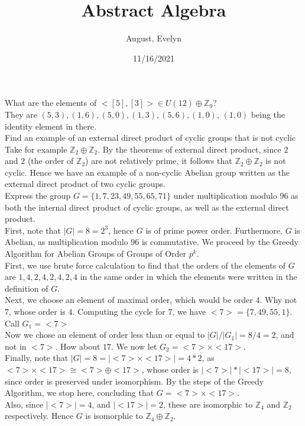 \documentclass{article}
\title{Abstract Algebra}
\author{August, Evelyn}
\date{11/16/2021}
\newcommand{\Z}{\mathbb{Z}}
\begin{document}
\maketitle
 What are the elements of $<[5],[3]>\in U(12)\oplus \Z_9$?\\

 They are $(5,3),(1,6), (5,0), (1,3), (5,6), (1,0)$, $(1,0)$ being the identity element in there.
\\


Find an example of an external direct product of cyclic groups that is not cyclic\\

 Take for example $\Z_2\oplus \Z_2$. By the theorems of external direct product, since $2$ and $2$ (the order of $\Z_2$) are not relatively prime, it follows that $\Z_2\oplus\Z_2$ is not cyclic. Hence we have an example of a non-cyclic Abelian group written as the external direct product of two cyclic groups.\\


 Express the group $G = \{1,7,23,49,55,65,71\}$ under multiplication modulo 96 as both the internal direct product of cyclic groups, as well as the external direct product.\\

 First, note that $|G| = 8  = 2^3$, hence $G$ is of prime power order. Furthermore, $G$ is Abelian, as multiplication modulo 96 is commutative. We proceed by the Greedy Algorithm for Abelian Groups of Groups of Order $p^k$.\\
First, we use brute force calculation to find that the orders of the elements of $G$ are $1,4,2,4,2,4,2,4$ in the same order in which the elements were written in the definition of $G$.\\

Next, we choose an element of maximal order, which would be order $4$. Why not $7$, whose order is $4$. Computing the cycle for $7$, we have $<7> = \{7, 49, 55, 1\}$. Call $G_1 = <7>$\\

Now we chose an element of order less than or equal to $|G|/|G_1| = 8/4 = 2$, and not in $<7>$. How about $17$. We now let $G_2 = <7>\times <17>$.\\

Finally, note that $|G| = 8 = |<7>\times <17>| = 4*2 $, as $<7>\times <17>\cong <7>\oplus <17>$, whose order is $|<7>|*|<17>| = 8$, since order is preserved under isomorphism. By the steps of the Greedy Algorithm, we stop here, concluding that $G = <7>\times <17>$.\\ Also, since $|<7>| = 4$, and $|<17>| = 2$, these are isomorphic to $\Z_4$ and $\Z_2$ respectively. Hence $G$ is isomorphic to $\Z_4\oplus \Z_2$.\\
\end{document}
